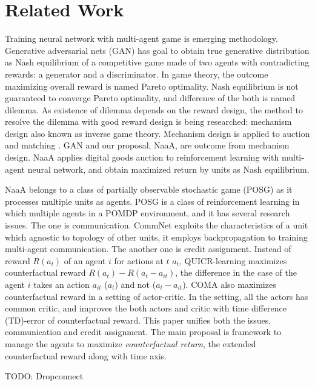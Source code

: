 \section{Related Work}
Training neural network with multi-agent game is emerging methodology.
Generative adversarial nets (GAN) \citep{goodfellow2014generative} has goal to obtain true generative distribution as Nash equilibrium of a competitive game made of two agents with contradicting rewards: a generator and a discriminator. 
In game theory, the outcome maximizing overall reward is named Pareto optimality.
Nash equilibrium is not guaranteed to converge Pareto optimality, and difference of the both is named dilemma.
As existence of dilemma depends on the reward design, the method to resolve the dilemma with good reward design is being researched: mechanism design \citep{myerson1983mechanism} also known as inverse game theory.
Mechanism design is applied to auction \citep{vickrey1961counterspeculation} and matching \citep{gale1962college}.
GAN and our proposal, NaaA, are outcome from mechanism design.
NaaA applies digital goods auction \citep{guruswami2005profit} to reinforcement learning with multi-agent neural network, 
and obtain maximized return by units as Nash equilibrium.

NaaA belongs to a class of partially observable stochastic game (POSG) \citep{hansen2004dynamic} as it processes multiple units as agents.
POSG is a class of reinforcement learning in which multiple agents in a POMDP environment, and it has several research issues.
The one is communication.
CommNet \citep{sukhbaatar2016learning} exploits the characteristics of a unit which agnostic to topology of other units, it employs backpropagation to training multi-agent communication.
The another one is credit assignment.
Instead of reward $R(a_t)$ of an agent $i$ for actions at $t$ $a_t$, 
QUICR-learning \citep{agogino2006quicr} maximizes counterfactual reward $R(a_t) - R(a_t - a_{it})$, the difference in the case of the agent $i$ takes an action $a_{it}$ ($a_t$) and not ($a_t-a_{it}$).
COMA \citep{foerster2017counterfactual} also maximizes counterfactual reward in a setting of actor-critic.
In the setting, all the actors has common critic, and improves the both actors and critic with time difference (TD)-error of counterfactual reward.
This paper unifies both the issues, communication and credit assignment.
The main proposal is framework to manage the agents to maximize {\em counterfactual return}, the extended counterfactual reward along with time axis.

TODO: Dropconnect
